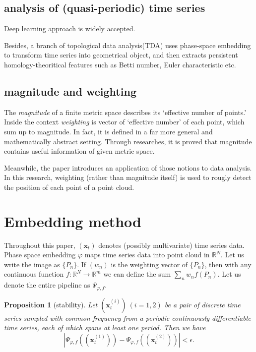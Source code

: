 \documentclass{article}
\newcommand{\R}{\mathbb{R}}
\newtheorem{prop}{Proposition}
\begin{document}
\subsection{analysis of (quasi-periodic) time series}
Deep learning approach is widely accepted. 

Besides, a branch of topological data analysis(TDA) uses phase-space embedding to transform time series into geometrical object, and then extracts persistent homology-theoritical features such as Betti number, Euler characteristic etc. 

\subsection{magnitude and weighting}

The \emph{magnitude} of a finite metric space describes its `effective number of points.' \cite{Leinster2013}
Inside the context \emph{weighting} is vector of `effective number' of each point, which sum up to magnitude. 
In fact, it is defined in a far more general and mathematically abstract setting.
Through researches, it is proved that magnitude contains useful information of given metric space.

Meanwhile, the paper \cite{Bunch2020} introduces an application of those notions to data analysis. 
In this research, weighting (rather than magnitude itself) is used to rougly detect the position of each point of a point cloud. 

\section{Embedding method}
Throughout this paper, $(\mathbf{x}_t)$ denotes (possibly multivariate) time series data. 
Phase space embedding $\varphi$ maps time series data into point cloud in $\R^N$. 
Let us write the image as $\{P_{n}\}$.
If $(w_n)$ is the weighting vector of $\{P_n\}$, then with any continuous function $f:\R^N \rightarrow \R^m$ we can define the sum $\sum_n w_n f(P_n)$. 
Let us denote the entire pipeline as $\Psi_{\varphi, f}$.

\begin{prop}[stability]
Let $(\mathbf{x}_t^{(i)})\ (i=1,2)$ be a pair of discrete time series sampled with common frequency from a periodic continuously differentiable time series, each of which spans at least one period. 
Then we have
	\begin{equation*}
	|\Psi_{\varphi, f}((\mathbf{x}_t^{(1)})) - \Psi_{\varphi, f}((\mathbf{x}_t^{(2)})) | < \epsilon.
	\end{equation*}
\end{prop}
\end{document}
